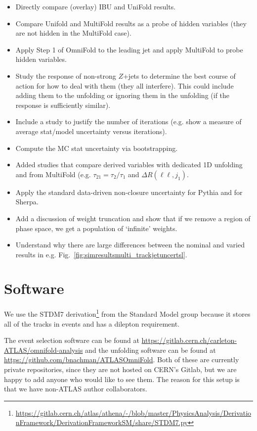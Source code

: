 \documentclass[NOTE, atlasdraft=true, texlive=2016, UKenglish]{\ATLASLATEXPATH atlasdoc}
\begin{document}
\begin{itemize}
\item Directly compare (overlay) IBU and UniFold results.
\item Compare Unifold and MultiFold results as a probe of hidden variables (they are not hidden in the MultiFold case).
\item Apply Step 1 of OmniFold to the leading jet and apply MultiFold to probe hidden variables.
\item Study the response of non-strong $Z$+jets to determine the best course of action for how to deal with them (they all interfere).   This could include adding them to the unfolding or ignoring them in the unfolding (if the response is sufficiently similar).
\item Include a study to justify the number of iterations (e.g. show a measure of average stat/model uncertainty versus iterations).
\item Compute the MC stat uncertainty via bootstrapping.
\item Added studies that compare derived variables with dedicated 1D unfolding and from MultiFold (e.g. $\tau_{21}=\tau_2/\tau_1$ and $\Delta R(\ell\ell,j_1)$.
\item Apply the standard data-driven non-closure uncertainty for Pythia and for Sherpa.
\item Add a discussion of weight truncation and show that if we remove a region of phase space, we get a population of `infinite' weights.
\item Understand why there are large differences between the nominal and varied results in e.g. Fig.~\ref{fig:simresultsmulti_trackjetuncertsl}.
\end{itemize}

\section{Software}

We use the STDM7 derivation\footnote{\url{https://gitlab.cern.ch/atlas/athena/-/blob/master/PhysicsAnalysis/DerivationFramework/DerivationFrameworkSM/share/STDM7.py}} from the Standard Model group because it stores all of the tracks in events and has a dilepton requirement.

The event selection software can be found at \url{https://gitlab.cern.ch/carleton-ATLAS/omnifold-analysis} and the unfolding software can be found at \url{https://github.com/bnachman/ATLASOmniFold}.  Both of these are currently private repositories, since they are not hosted on CERN's Gitlab, but we are happy to add anyone who would like to see them.  The reason for this setup is that we have non-ATLAS author collaborators.
\end{document}
